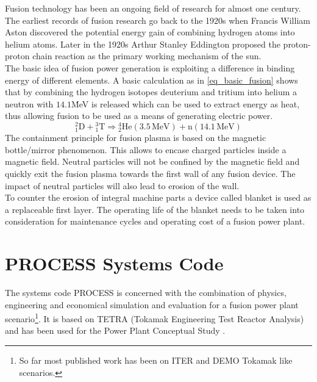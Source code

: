 	Fusion technology has been an ongoing field of research for almost one century. The earliest records of fusion research go back to the 1920s when Francis William Aston discovered the potential energy gain of combining hydrogen atoms into helium atoms. Later in the 1920s Arthur Stanley Eddington proposed the proton-proton chain reaction as the primary working mechanism of the sun.\\
	The basic idea of fusion power generation is exploiting a difference in binding energy of different elements. A basic calculation as in \ref{eq_basic_fusion} shows that by combining the hydrogen isotopes deuterium and tritium into helium a neutron with $14.1$\.MeV is released which can be used to extract energy as heat, thus allowing fusion to be used as a means of generating electric power.
	\begin{equation}
		{}^2_1\textrm{D} + {}^3_1\textrm{T} \Rightarrow {}^4_2\textrm{He} (3.5\,\textrm{MeV}) + \textrm{n} (14.1\,\textrm{MeV})
		\label{eq_basic_fusion}
	\end{equation}
	The containment principle for fusion plasma is based on the magnetic bottle/mirror phenomenon. This allows to encase charged particles inside a magnetic field. Neutral particles will not be confined by the magnetic field and quickly exit the fusion plasma towards the first wall of any fusion device. The impact of neutral particles will also lead to erosion of the wall.\\
	To counter the erosion of integral machine parts a device called blanket is used as a replaceable first layer. The operating life of the blanket needs to be taken into consideration for maintenance cycles and operating cost of a fusion power plant.
	
	\section{PROCESS Systems Code}
	The systems code PROCESS\cite{process} is concerned with the combination of physics, engineering and economical simulation and evaluation for a fusion power plant scenario\footnote{So far most published work has been on ITER and DEMO Tokamak like scenarios.}. It is based on TETRA (Tokamak Engineering Test Reactor Analysis) \cite{TETRA}and has been used for the Power Plant Conceptual Study \cite{PPCS}.\\
	
